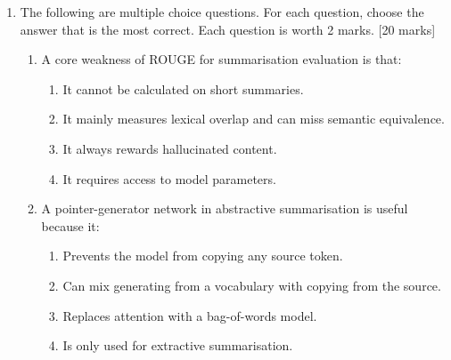 \documentclass[11pt,a4paper]{article}
\newcommand{\pts}[1]{\hfill [#1 marks]}
\begin{document}
\begin{enumerate}[leftmargin=*]
\begin{enumerate}
\item Explain why Transformer models need positional encodings. Then compare sinusoidal positional encodings and RoPE in terms of how they represent position. \pts{4}

\item RoPE-based models often require context-extension methods. Explain the intuition behind positional interpolation or YaRN, and state one tradeoff involved in extending the context window. \pts{3}

\item Full attention becomes expensive for very long inputs. Explain why its cost grows quickly with sequence length, and describe one efficient-attention strategy that could reduce cost. \pts{2}

\item Long context does not guarantee that the model uses all evidence equally well. Describe two ways you would evaluate whether the model can actually use information in the middle of a long contract. \pts{3}

\item The team considers chain-of-thought prompting and self-consistency for clause-based reasoning. Explain how self-consistency works, and give one reason it might improve answers and one reason it might be unsuitable for deployment. \pts{3}
\end{enumerate}

\newpage

\item The following are multiple choice questions. For each question, choose the answer that is the most correct. Each question is worth 2 marks. \pts{20}

\begin{enumerate}
\item A core weakness of ROUGE for summarisation evaluation is that:
\begin{enumerate}[label=\Alph*.]
\item It cannot be calculated on short summaries.
\item It mainly measures lexical overlap and can miss semantic equivalence.
\item It always rewards hallucinated content.
\item It requires access to model parameters.
\end{enumerate}

\item A pointer-generator network in abstractive summarisation is useful because it:
\begin{enumerate}[label=\Alph*.]
\item Prevents the model from copying any source token.
\item Can mix generating from a vocabulary with copying from the source.
\item Replaces attention with a bag-of-words model.
\item Is only used for extractive summarisation.
\end{enumerate}


\end{enumerate}
\end{enumerate}
\end{document}
